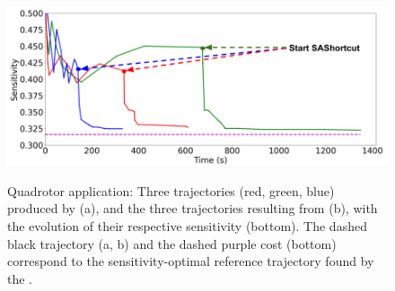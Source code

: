 

\begin{figure}[h!]
    \centering
    \\
    \includegraphics[width=0.7\linewidth]{figures/samp/U_shape_3in1_sensi.png}
    \caption{Quadrotor application: Three trajectories (red, green, blue) produced by  (a), and the three trajectories resulting from  (b), with the evolution of their respective sensitivity (bottom). 
    The dashed black trajectory (a, b) and the dashed purple cost (bottom) correspond to the sensitivity-optimal reference trajectory found by the .}
    \label{fig:U_shape}
\end{figure}

